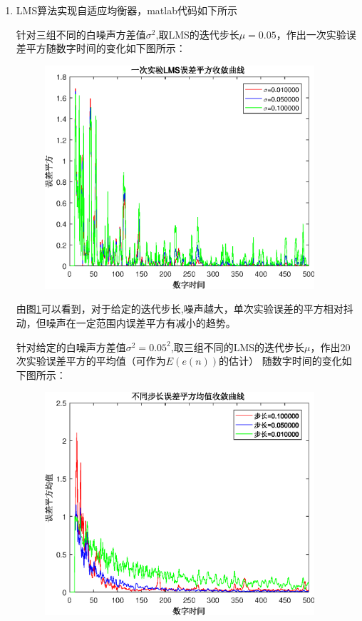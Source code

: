 \documentclass{article}
\begin{document}
\begin{enumerate}[label={(\arabic*)}]
\item LMS算法实现自适应均衡器，matlab代码如下所示

针对三组不同的白噪声方差值$\sigma^2$,取LMS的迭代步长$\mu=0.05$，作出一次实验误差平方随数字时间的变化如下图所示：

\begin{figure}[!ht]
\centering
\includegraphics[width=10cm]{lml_one_time.eps}
\caption{}\label{fig:1}
\end{figure}

由图\ref{fig:1}可以看到，对于给定的迭代步长,噪声越大，单次实验误差的平方相对抖动，但噪声在一定范围内误差平方有减小的趋势。

针对给定的白噪声方差值$\sigma^2=0.05^2$,取三组不同的LMS的迭代步长$\mu$，作出20次实验误差平方的平均值（可作为$E(e(n))$的估计）
随数字时间的变化如下图所示：

\begin{figure}[!ht]
\centering
\includegraphics[width=10cm]{lml_many_times.eps}
\caption{}\label{fig:2}
\end{figure}


\end{enumerate}
\end{document}
